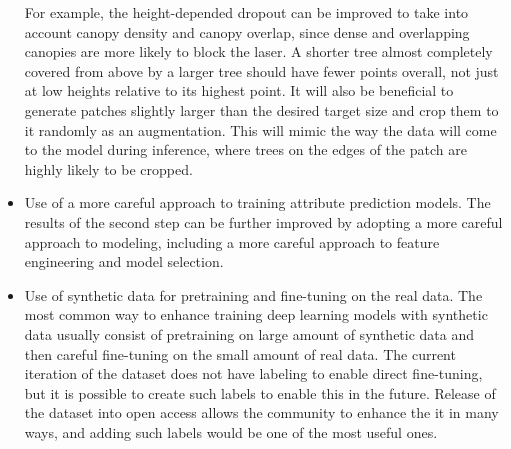 \begin{itemize}
  For example, the height-depended dropout can be improved to take into account canopy density and canopy overlap, since dense and overlapping canopies are more likely to block the laser.
  A shorter tree almost completely covered from above by a larger tree should have fewer points overall, not just at low heights relative to its highest point.
  It will also be beneficial to generate patches slightly larger than the desired target size and crop them to it randomly as an augmentation.
  This will mimic the way the data will come to the model during inference, where trees on the edges of the patch are highly likely to be cropped.
\item Use of a more careful approach to training attribute prediction models.
The results of the second step can be further improved by adopting a more careful approach to modeling, including a more careful approach to feature engineering and model selection.
\item Use of synthetic data for pretraining and fine-tuning on the real data.
  The most common way to enhance training deep learning models with synthetic data usually consist of pretraining on large amount of synthetic data and then careful fine-tuning on the small amount of real data.
  The current iteration of the dataset does not have labeling to enable direct fine-tuning, but it is possible to create such labels to enable this in the future.
  Release of the dataset into open access allows the community to enhance the it in many ways, and adding such labels would be one of the most useful ones.

\end{itemize}
